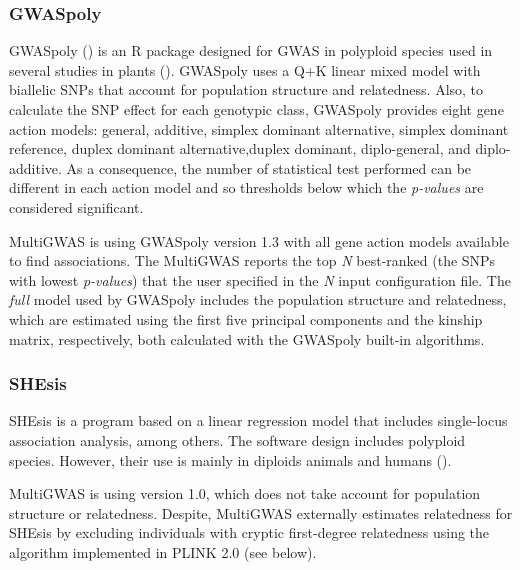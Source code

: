 \documentclass{article}
\begin{document}
\subsubsection{GWASpoly\label{subsec_GWASpoly}}
GWASpoly (\cite{Rosyara2016}) is an R package designed for GWAS in polyploid species used in several studies in plants (\cite{Berdugo2017,Ferrao2018,Sharma2018,Yuan2019}). GWASpoly uses a Q+K linear mixed model with biallelic SNPs that account for population structure and relatedness. Also, to calculate the SNP effect for each genotypic class, GWASpoly provides eight gene action models: general, additive, simplex dominant alternative, simplex dominant reference, duplex dominant alternative,duplex dominant, diplo-general, and diplo-additive. As a consequence, the number of statistical test performed can be different in each action model and so thresholds below which the \emph{p-values} are considered significant.

MultiGWAS is using GWASpoly version 1.3 with all gene action models available to find associations. The MultiGWAS reports the top \emph{N} best-ranked (the SNPs with lowest \emph{p-values})  that the user specified in the \emph{N} input configuration file. The \emph{full }model used by GWASpoly includes the population structure and relatedness, which are estimated using the first five principal components and the kinship matrix, respectively, both calculated with the GWASpoly built-in algorithms.

\subsubsection{SHEsis}

SHEsis is a program based on a linear regression model that includes single-locus association analysis, among others. The software design includes polyploid species. However, their use is mainly in diploids animals and humans (\cite{Qiao2015,Meng2019}).

MultiGWAS is using version 1.0, which does not take account for population structure or relatedness. Despite, MultiGWAS externally estimates relatedness for SHEsis by excluding individuals with cryptic first-degree relatedness using the algorithm implemented in PLINK 2.0 (see below).
\end{document}
